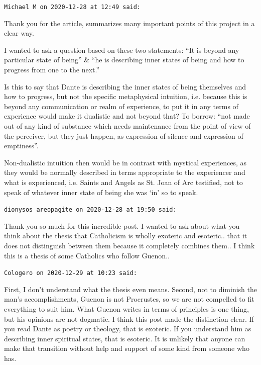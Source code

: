 \begin{footnotesize}
\begin{sffamily}
\texttt{Michael M on 2020-12-28 at 12:49 said:}

Thank you for the article, summarizes many important points of this project in a clear way.

I wanted to ask a question based on these two statements: ``It is beyond any particular state of being'' \& ``he is describing inner states of being and how to progress from one to the next.''

Is this to say that Dante is describing the inner states of being themselves and how to progress, but not the specific metaphysical intuition, i.e. because this is beyond any communication or realm of experience, to put it in any terms of experience would make it dualistic and not beyond that? To borrow: ``not made out of any kind of substance which needs maintenance from the point of view of the perceiver, but they just happen, as expression of silence and expression of emptiness''.

Non-dualistic intuition then would be in contrast with mystical experiences, as they would be normally described in terms appropriate to the experiencer and what is experienced, i.e. Saints and Angels as St. Joan of Arc testified, not to speak of whatever inner state of being she was `in' so to speak.

\hfill

\texttt{dionysos areopagite on 2020-12-28 at 19:50 said:}

Thank you so much for this incredible post. I wanted to ask about what you think about the thesis that Catholicism is wholly exoteric and esoteric.. that it does not distinguish between them because it completely combines them.. I think this is a thesis of some Catholics who follow Guenon..

\hfill

\texttt{Cologero on 2020-12-29 at 10:23 said:}

First, I don't understand what the thesis even means. Second, not to diminish the man's accomplishments, Guenon is not Procrustes, so we are not compelled to fit everything to suit him. What Guenon writes in terms of principles is one thing, but his opinions are not dogmatic. I think this post made the distinction clear. If you read Dante as poetry or theology, that is exoteric. If you understand him as describing inner spiritual states, that is esoteric. It is unlikely that anyone can make that transition without help and support of some kind from someone who has.


\end{sffamily}
\end{footnotesize}
